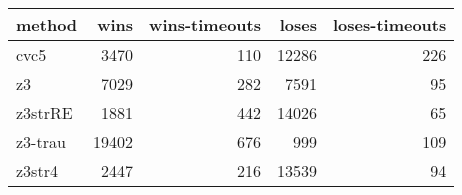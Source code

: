 \begin{tabular}{lrrrr}
\hline
 method   &   wins &   wins-timeouts &   loses &   loses-timeouts \\
\hline
 cvc5     &   3470 &             110 &   12286 &              226 \\
 z3       &   7029 &             282 &    7591 &               95 \\
 z3strRE  &   1881 &             442 &   14026 &               65 \\
 z3-trau  &  19402 &             676 &     999 &              109 \\
 z3str4   &   2447 &             216 &   13539 &               94 \\
\hline
\end{tabular}
